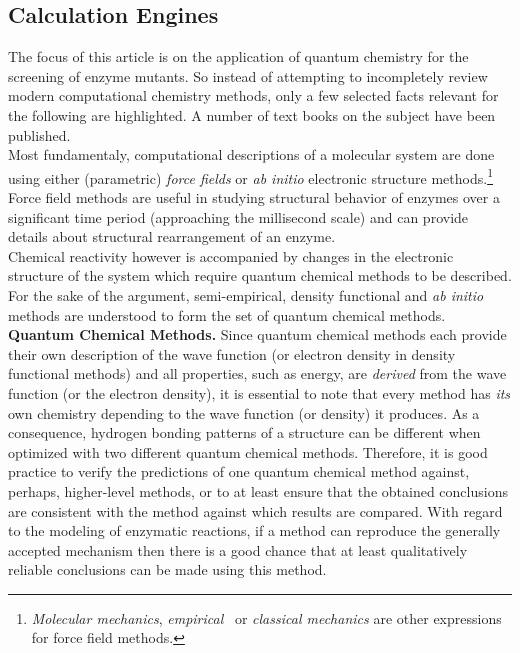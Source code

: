 \subsection{Calculation Engines}\label{sec:calculation_engines}
The focus of this article is on the application of quantum chemistry for the screening of enzyme mutants.
So instead of attempting to incompletely review modern computational chemistry methods, only a few selected facts relevant for the following are highlighted.
A number of text books on the subject have been published\cite{young2004computational, jensen2007introduction, cramer2013essentials}.\\
Most fundamentaly, computational descriptions of a molecular system are done using either (parametric) \textit{force fields} or \textit{ab initio} electronic structure methods.\footnote{\textit{Molecular mechanics}, \textit{empirical } or \textit{classical mechanics} are other expressions for force field methods.}
Force field methods are useful in studying structural behavior of enzymes over a significant time period (approaching the millisecond scale) and can provide details about structural rearrangement of an enzyme.\\
Chemical reactivity however is accompanied by changes in the electronic structure of the system which require quantum chemical methods to be described.
For the sake of the argument, semi-empirical, density functional and \textit{ab initio} methods are understood to form the set of quantum chemical methods.\\
\textbf{Quantum Chemical Methods.}
Since quantum chemical methods each provide their own description of the wave function (or electron density in density functional methods) and all properties, such as energy, are \textit{derived} from the wave function (or the electron density), it is essential to note that every method has \textit{its} own chemistry depending to the wave function (or density) it produces.
As a consequence, hydrogen bonding patterns of a structure can be different when optimized with two different quantum chemical methods.
Therefore, it is good practice to verify the predictions of one quantum chemical method against, perhaps, higher-level methods, or to at least ensure that the obtained conclusions are consistent with the method against which results are compared.
With regard to the modeling of enzymatic reactions, if a method can reproduce the generally accepted mechanism then there is a good chance that at least qualitatively reliable conclusions can be made using this method.\\
